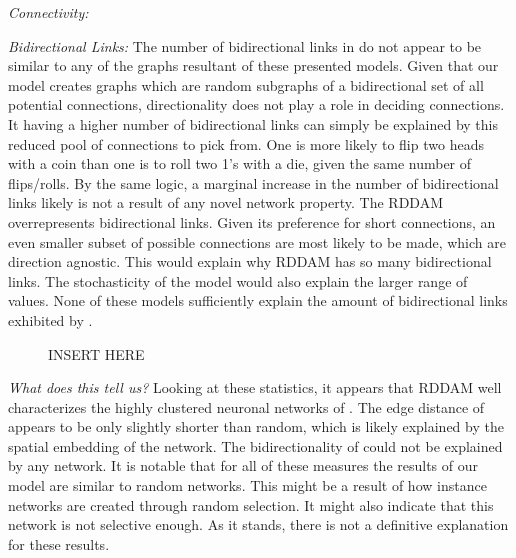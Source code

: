 \textit{Connectivity:}

\textit{Bidirectional Links:} The number of bidirectional links in \ce do not appear to be similar to any of the graphs resultant of these presented models. Given that our model creates graphs which are random subgraphs of a bidirectional set of all potential connections, directionality does not play a role in deciding connections. It having a higher number of bidirectional links can simply be explained by this reduced pool of connections to pick from. One is more likely to flip two heads with a coin than one is to roll two 1's with a die, given the same number of flips/rolls. By the same logic, a marginal increase in the number of bidirectional links likely is not a result of any novel network property.
The RDDAM overrepresents bidirectional links. Given its preference for short connections, an even smaller subset of possible connections are most likely to be made, which are direction agnostic. This would explain why RDDAM has so many bidirectional links. The stochasticity of the model would also explain the larger range of values. None of these models sufficiently explain the amount of bidirectional links exhibited by \ce. 




\begin{figure}[H]
  
  \caption{INSERT HERE}
\end{figure}

\textit{What does this tell us?} Looking at these statistics, it appears that RDDAM well characterizes the highly clustered neuronal networks of \ce. The edge distance of \ce appears to be only slightly shorter than random, which is likely explained by the spatial embedding of the network. The bidirectionality of \ce could not be explained by any network. 
It is notable that for all of these measures the results of our model are similar to random networks. This might be a result of how instance networks are created through random selection. It might also indicate that this network is not selective enough. As it stands, there is not a definitive explanation for these results.

